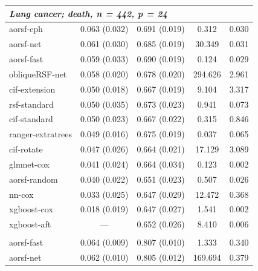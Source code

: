 \documentclass[twoside,11pt]{article}\usepackage[]{graphicx}\usepackage[]{xcolor}
\newenvironment{knitrout}{}{} %
\begin{document}
\begin{knitrout}
\begin{longtable}[t]{lcccc}
\multicolumn{5}{l}{\textit{\textbf{Lung cancer; death, n = 442, p = 24}}}\\
\hline
\hspace{1em}aorsf-cph & 0.063 (0.032) & 0.691 (0.019) & 0.312 & 0.030\\
\hspace{1em}aorsf-net & 0.061 (0.030) & 0.685 (0.019) & 30.349 & 0.031\\
\hspace{1em}aorsf-fast & 0.059 (0.033) & 0.690 (0.019) & 0.124 & 0.029\\
\hspace{1em}obliqueRSF-net & 0.058 (0.020) & 0.678 (0.020) & 294.626 & 2.961\\
\hspace{1em}cif-extension & 0.050 (0.018) & 0.667 (0.019) & 9.104 & 3.317\\
\hspace{1em}rsf-standard & 0.050 (0.035) & 0.673 (0.023) & 0.941 & 0.073\\
\hspace{1em}cif-standard & 0.050 (0.023) & 0.667 (0.022) & 0.315 & 0.846\\
\hspace{1em}ranger-extratrees & 0.049 (0.016) & 0.675 (0.019) & 0.037 & 0.065\\
\hspace{1em}cif-rotate & 0.047 (0.026) & 0.664 (0.021) & 17.129 & 3.089\\
\hspace{1em}glmnet-cox & 0.041 (0.024) & 0.664 (0.034) & 0.123 & 0.002\\
\hspace{1em}aorsf-random & 0.040 (0.022) & 0.651 (0.023) & 0.507 & 0.026\\
\hspace{1em}nn-cox & 0.033 (0.025) & 0.647 (0.029) & 12.472 & 0.368\\
\hspace{1em}xgboost-cox & 0.018 (0.019) & 0.647 (0.027) & 1.541 & 0.002\\
\hspace{1em}xgboost-aft & --- & 0.652 (0.026) & 8.410 & 0.006\\
\addlinespace[0.3em]
\multicolumn{5}{l}{\textit{\textbf{MESA; coronary heart disease, n = 6785, p = 48}}}\\
\hline
\hspace{1em}aorsf-fast & 0.064 (0.009) & 0.807 (0.010) & 1.333 & 0.340\\
\hspace{1em}aorsf-net & 0.062 (0.010) & 0.805 (0.012) & 169.694 & 0.379\\

\end{longtable}
\end{knitrout}
\end{document}
